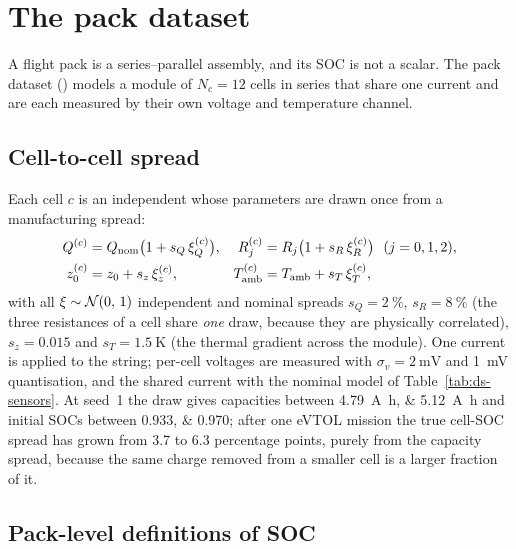 \section{The pack dataset}
\label{sec:ds-pack}

A flight pack is a series--parallel assembly, and its SOC is not a scalar. The pack dataset
() models a module of $N_c = 12$ cells in series that share one
current and are each measured by their own voltage and temperature channel.

\subsection{Cell-to-cell spread}

Each cell $c$ is an independent  whose parameters are drawn once from a manufacturing
spread:
\begin{align}
Q^{(c)} &= Q_{\text{nom}}\bigl(1 + s_Q\,\xi^{(c)}_Q\bigr), &
R^{(c)}_j &= R_j\bigl(1 + s_R\,\xi^{(c)}_R\bigr)\ \ (j=0,1,2), \label{eq:ds-pack-par}\\
z^{(c)}_0 &= z_0 + s_z\,\xi^{(c)}_z, &
T^{(c)}_{\text{amb}} &= T_{\text{amb}} + s_T\,\xi^{(c)}_T, \label{eq:ds-pack-init}
\end{align}
with all $\xi\sim\mathcal{N}\!\left(0,\,1\right)$ independent and nominal spreads $s_Q = \SI{2}{\percent}$,
$s_R = \SI{8}{\percent}$ (the three resistances of a cell share \emph{one} draw, because they are
physically correlated), $s_z = \num{0.015}$ and $s_T = \SI{1.5}{\kelvin}$ (the thermal gradient
across the module). One current is applied to the string; per-cell voltages are measured with
$\sigma_v=\SI{2}{\milli\volt}$ and \SI{1}{\milli\volt} quantisation, and the shared current with the
nominal model of Table~\ref{tab:ds-sensors}. At seed~1 the draw gives capacities between
\SIlist{4.79;5.12}{\ampere\hour} and initial SOCs between \numlist{0.933;0.970}; after one eVTOL
mission the true cell-SOC spread has grown from \num{3.7} to \num{6.3} percentage points, purely
from the capacity spread, because the same charge removed from a smaller cell is a larger fraction
of it.

\subsection{Pack-level definitions of SOC}

